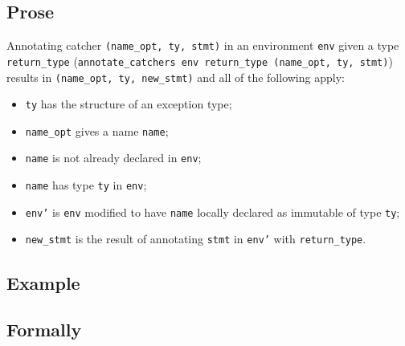 \documentclass{book}
\newcommand\todocomment[1]{}
\newcommand\name[0]{\texttt{name}}
\newcommand\annotateblock[1]{\texttt{annotate\_block}(#1)}
\newcommand\annotatecatcher[1]{\texttt{annotate\_catcher}(#1)}
\newcommand\checkvarnotinenv[1]{\texttt{check\_var\_not\_in\_env}(#1)}
\newcommand\tty[0]{\texttt{ty}}
\begin{document}
\begin{itemize}
  \subsection{Prose}
   Annotating catcher \texttt{(name\_opt, ty, stmt)} in an environment
\texttt{env} given a type \texttt{return\_type} (\texttt{annotate\_catchers env return\_type (name\_opt, ty, stmt)})
results in \texttt{(name\_opt, ty, new\_stmt)} and all of the following apply:
   \begin{itemize}
   \item \texttt{ty} has the structure of an exception type;
   \item \texttt{name\_opt} gives a name \texttt{name};
   \item \texttt{name} is not already declared in \texttt{env};
   \item \texttt{name} has type \texttt{ty} in \texttt{env}; \todocomment{ROMAN: doesn't appear in the code}
   \item \texttt{env'} is \texttt{env} modified to have \texttt{name} locally declared as immutable of type \texttt{ty};
   \item \texttt{new\_stmt} is the result of annotating \texttt{stmt} in \texttt{env'} with \texttt{return\_type}.
   \end{itemize}

  \subsection{Example}



\begin{emptyformal}
    \subsection{Formally}
\end{emptyformal}


\end{itemize}
\end{document}
